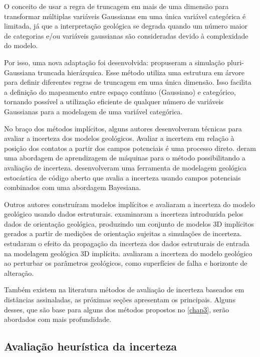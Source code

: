 O conceito de usar a regra de truncagem em mais de uma dimensão para transformar múltiplas variáveis Gaussianas em uma única variável categórica é limitada, já que a interpretação geológica se degrada quando um número maior de categorias e/ou variáveis gaussianas são consideradas devido à complexidade do modelo.

Por isso, uma nova adaptação foi desenvolvida:  propuseram a simulação pluri-Gaussiana truncada hierárquica. Esse método utiliza uma estrutura em árvore para definir diferentes regras de truncagem em uma única dimensão. Isso facilita a definição do mapeamento entre espaço contínuo (Gaussiano) e categórico, tornando possível a utilização eficiente de qualquer número de variáveis Gaussianas para a modelagem de uma variável categórica.

No braço dos métodos implícitos, alguns autores desenvolveram técnicas para avaliar a incerteza dos modelos geológicos. Avaliar a incerteza em relação à posição dos contatos a partir dos campos potenciais é uma  processo direto.  deram uma abordagem de aprendizagem de máquinas para o método possibilitando a avaliação de incerteza.  desenvolveram uma ferramenta de modelagem geológica estocástica de código aberto que avalia a incerteza usando campos potenciais combinados com uma abordagem Bayesiana.

Outros autores construíram modelos implícitos e avaliaram a incerteza do modelo geológico usando dados estruturais.  examinaram a incerteza introduzida pelos dados de orientação geológica, produzindo um conjunto de modelos 3D implícitos gerados a partir de medições de orientação sujeitas a simulações de incerteza.  estudaram o efeito da propagação da incerteza dos dados estruturais de entrada na modelagem geológica 3D implícita.  avaliaram a incerteza do modelo geológico ao perturbar os parâmetros geológicos, como superfícies de falha e horizonte de alteração.

Também existem na literatura métodos de avaliação de incerteza baseados em distâncias assinaladas, as próximas seções apresentam os principais. Alguns desses, que são base para alguns dos métodos propostos no \autoref{chap3}, serão abordados com mais profundidade.

\subsection{Avaliação heurística da incerteza}\label{heuristic}

